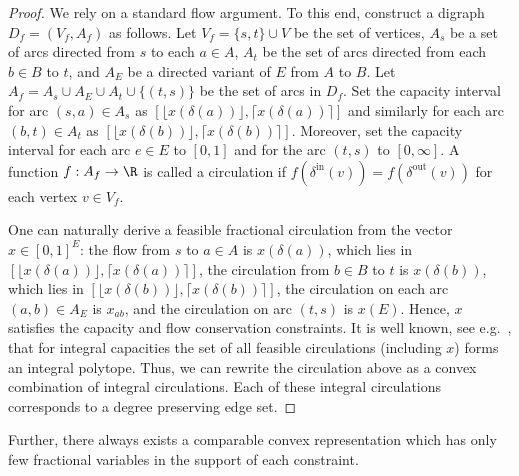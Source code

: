 \documentclass[a4paper,USenglish,cleveref,thm-restate]{lipics-v2021}
\begin{document}
\begin{proof}
    We rely on a standard flow argument. 
    To this end, construct a digraph $D_f = (V_f , A_f)$ as follows. Let $V_f = \{s,t\} \cup V$ be the set of vertices, $A_s$ be a set of arcs directed from $s$ to each $a \in A$, $A_t$ be the set of arcs directed from each $b \in B$ to $t$, and $A_E$ be a directed variant of $E$ from $A$ to $B$. Let $A_f = A_s \cup A_E  \cup A_t \cup \{(t,s)\}$ be the set of arcs in $D_f$. Set the capacity interval for arc $(s,a) \in A_s$ as $[\lfloor x(\delta(a)) \rfloor, \lceil x(\delta(a)) \rceil]$ and similarly for each arc $(b,t) \in A_t$ as $[\lfloor x(\delta(b)) \rfloor, \lceil x(\delta(b)) \rceil]$. Moreover, set the capacity interval for each arc $e \in E$ to $[0,1]$ and for the arc $(t,s)$ to $[0,\infty]$. A function $f: A_f \rightarrow \R$ is called a circulation if $f(\delta^{\mathrm{in}}(v)) = f(\delta^{\mathrm{out}}(v))$ for each vertex $v \in V_f$. 
    
    One can naturally derive a feasible fractional circulation from the vector $x\in [0,1]^E$: the flow from $s$ to $a \in A$ is $x(\delta(a))$, which lies in $[\lfloor x(\delta(a)) \rfloor, \lceil x(\delta(a)) \rceil]$, the circulation from $b \in B$ to $t$ is $x(\delta(b))$, which lies in $[\lfloor x(\delta(b)) \rfloor, \lceil x(\delta(b)) \rceil]$, the circulation on each arc $(a,b) \in A_E$ is $x_{ab}$, and the circulation on arc $(t,s)$ is $x(E)$. Hence, $x$ satisfies the capacity and flow conservation constraints. 
    It is well known, see e.g.~\cite[Corollary 13.10b]{schrijver2003combinatorial}, that for integral capacities the set of all feasible circulations (including $x$) forms an integral polytope. Thus, we can rewrite the circulation above as a convex combination
    of integral circulations. Each of these integral circulations corresponds
    to a degree preserving edge set.
\end{proof}

Further, there always exists a comparable convex representation which has only few fractional variables in the support of each constraint.

\BoundedNumberOfFracVariables*
\end{document}
